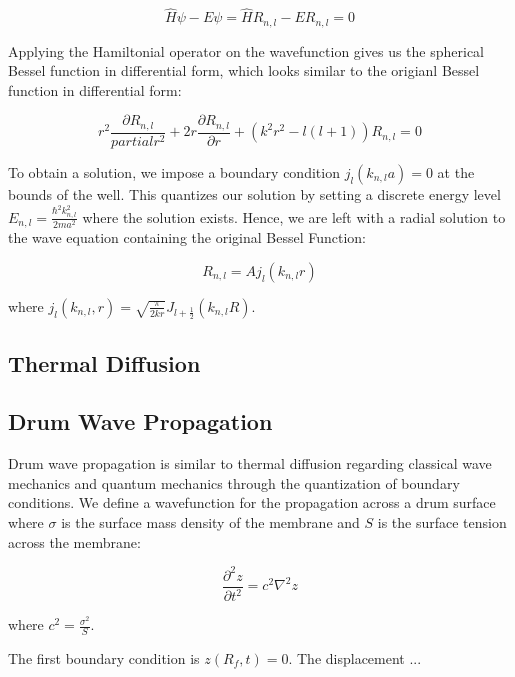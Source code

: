 \documentclass[linenumbers, RNAAS, trackchanges]{aastex631}
\begin{document}
\begin{equation}
    \hat{H}\psi-E\psi=\hat{H}R_{n,l}-ER_{n,l}=0
\end{equation}

\noindent Applying the Hamiltonial operator on the wavefunction gives us the
spherical Bessel function in differential form, which looks similar to the
origianl Bessel function in differential form:

\begin{equation}
    r^2\frac{\partial R_{n,l}}{partial r^2} + 2r\frac{\partial R_{n,l}}{\partial r} +(k^2r^2-l(l+1))R_{n,l}=0
\end{equation}

\noindent To obtain a solution, we impose a boundary condition $j_l(k_{n,l}a)=0$ at the
bounds of the well. This quantizes our solution by setting a discrete energy
level $E_{n,l}=\frac{\hbar^2k_{n,l}^2}{2ma^2}$ where the solution exists. Hence,
we are left with a radial solution to the wave equation containing the original
Bessel Function:

\begin{equation}
    R_{n,l}=Aj_l(k_{n,l}r)
\end{equation}

\noindent where $j_l(k_{n,l},r)=\sqrt{\frac{\pi}{2kr}}J_{l+\frac{1}{2}}(k_{n,l}R)$.

\subsection{Thermal Diffusion}


\subsection{Drum Wave Propagation}

Drum wave propagation is similar to thermal diffusion regarding classical wave 
mechanics and quantum mechanics through the quantization of boundary conditions.
We define a wavefunction for the propagation across a drum surface where $\sigma$
is the surface mass density of the membrane and $S$ is the surface tension
across the membrane:

\begin{equation}
    \frac{\partial^2z}{\partial t^2}=c^2\nabla^2z
\end{equation}

\noindent where $c^2=\frac{\sigma^2}{S}$.

The first boundary condition is $z(R_f,t)=0$. The displacement ...
\end{document}
